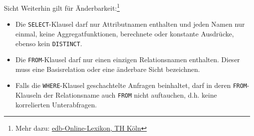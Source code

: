 \begin{defi}{Sicht}
    Weiterhin gilt für Änderbarkeit:\footnote{Mehr dazu: \href{https://wikis.gm.fh-koeln.de/Datenbanken/Aenderbare-Sicht}{edb-Online-Lexikon, TH Köln}}
    \begin{itemize}
        \item Die \texttt{SELECT}-Klausel darf nur Attributnamen enthalten und jeden Namen nur einmal, keine Aggregatfunktionen, berechnete oder konstante Ausdrücke, ebenso kein \texttt{DISTINCT}.
        \item Die \texttt{FROM}-Klausel darf nur einen einzigen Relationsnamen enthalten.
              Dieser muss eine Basisrelation oder eine änderbare Sicht bezeichnen.
        \item Falls die \texttt{WHERE}-Klausel geschachtelte Anfragen beinhaltet, darf in deren \texttt{FROM}- Klauseln der Relationsname auch \texttt{FROM} nicht auftauchen, d.h. keine korrelierten Unterabfragen.
    \end{itemize}
\end{defi}

